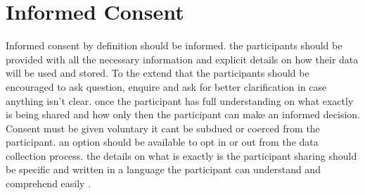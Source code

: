 \documentclass{article}
\begin{document}
	\newpage
\section{Informed Consent}

Informed consent by definition should be informed. the participants should be provided with all the necessary information and explicit details on how their data will be used and stored. To the extend that the participants should be encouraged to ask question, enquire and ask for better clarification in case anything isn't clear. once the participant has full understanding on what exactly is being shared and how only then the participant can make an informed decision. Consent must be given voluntary it cant be subdued or coerced from the participant. an option should be available to opt in or out from the data collection process. the details on what is exactly is the participant sharing should be specific and written in a language the participant can understand and comprehend easily \cite{Hempton2020}. 
\end{document}

